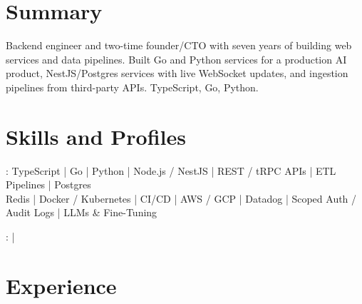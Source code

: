 \documentclass[print]{jack-resume}
\begin{document}
\pagecolor{darkmodeBackground}


\begin{minipage}[t][1cm][t]{.03\textwidth}
    \hfill
\end{minipage}

\section{Summary}
Backend engineer and two-time founder/CTO with seven years of building web services and data pipelines. Built Go and Python services for a production AI product, NestJS/Postgres services with live WebSocket updates, and ingestion pipelines from third-party APIs. TypeScript, Go, Python.
\sectionsep

\section{Skills and Profiles}
:
TypeScript \hfill | \hfill
Go \hfill | \hfill
Python \hfill | \hfill
Node.js / NestJS \hfill | \hfill
REST / tRPC APIs \hfill | \hfill
ETL Pipelines \hfill | \hfill
Postgres \\
\hspace{1.0cm} Redis \hfill | \hfill
Docker / Kubernetes \hfill | \hfill
CI/CD \hfill | \hfill
AWS / GCP \hfill | \hfill
Datadog \hfill | \hfill
Scoped Auth / Audit Logs \hfill | \hfill
LLMs \& Fine-Tuning \\

\raggedright{
    :
      \href{https://www.linkedin.com/in/jack-sturtevant/}{ \ExternalLink} |
     \href{https://github.com/jacksturt}{ \ExternalLink}}

\section{Experience}
\end{document}
